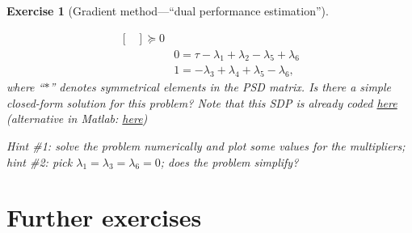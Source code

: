 \documentclass[11pt,a4paper]{article}
\newtheorem{exercise}{Exercise}
\begin{document}
\begin{exercise}[Gradient method---``dual performance estimation'']
\begin{enumerate}
{\begin{equation}
\begin{aligned}
\begin{bmatrix}
	\end{bmatrix}\succcurlyeq 0\\
	&0=\tau-\lambda_1+\lambda_2-\lambda_5+\lambda_6\\
	&1=-\lambda_3+\lambda_4+\lambda_5-\lambda_6,
	\end{aligned}
	\end{equation}}where ``$*$'' denotes symmetrical elements in the PSD matrix. Is there a simple closed-form solution for this problem? Note that this SDP is already coded \href{https://github.com/PerformanceEstimation/Learning-Performance-Estimation/tree/main/Exercises - codes/Jupyter/Exercise1.ipynb}{here} (alternative in Matlab: \href{https://github.com/PerformanceEstimation/Learning-Performance-Estimation/blob/main/Exercises - codes/Matlab/Exercise1_SDP_functionvalues.m}{here})
	
	Hint \#1: solve the problem numerically and plot some values for the multipliers; hint \#2: pick $\lambda_1=\lambda_3=\lambda_6=0$; does the problem simplify?
	\end{enumerate}
	\end{exercise}
	
	
	\section{Further exercises}\label{s:exo}		%
		
\end{document}
